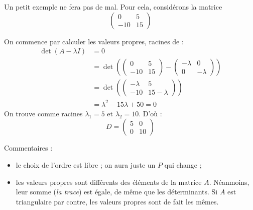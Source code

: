 \begin{exemple}
Un petit exemple ne fera pas de mal. Pour cela, considérons la matrice
\[ \begin{pmatrix} 0 & 5 \\ -10 & 15 \end{pmatrix} \]

On commence par calculer les valeurs propres, racines de :
\begin{align*}
\det(A-\lambda I) &= 0 \\
&= \det \left( \begin{pmatrix} 0 & 5 \\ -10 & 15 \end{pmatrix} - \begin{pmatrix} -\lambda & 0 \\ 0 & -\lambda \end{pmatrix} \right) \\
&= \det \left( \begin{pmatrix} -\lambda & 5 \\ -10 & 15-\lambda \end{pmatrix} \right) \\
&= \lambda^2 -15\lambda + 50 = 0
\end{align*}
On trouve comme racines $\lambda_1=5$ et $\lambda_2=10$. D'où :
\[ D = \begin{pmatrix} 5 & 0 \\ 0 & 10 \end{pmatrix} \]

Commentaires :
\begin{itemize}
\item le choix de l'ordre est libre ; on aura juste un $P$ qui change ;
\item les valeurs propres sont différents des éléments de la matrice $A$. Néanmoins, leur somme (\emph{la trace}) est égale, de même que les déterminants. Si $A$ est triangulaire par contre, les valeurs propres sont de fait les mêmes.
\end{itemize}


\end{exemple}

